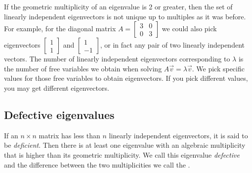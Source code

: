 \documentclass[12pt]{book}
\begin{document}
If the geometric multiplicity of an eigenvalue is 2 or greater,
then the set of linearly independent eigenvectors is not unique up to
multiples as it was before.  For example, for the diagonal matrix $A =
\left[ \begin{smallmatrix} 3 & 0 \\ 0 & 3 \end{smallmatrix} \right]$
we could also pick eigenvectors
$\left[ \begin{smallmatrix} 1 \\ 1 \end{smallmatrix} \right]$
and
$\left[ \begin{smallmatrix} 1 \\ -1 \end{smallmatrix} \right]$, or in fact
any pair of two linearly independent vectors.  The number of linearly
independent eigenvectors corresponding to $\lambda$
is the number of free variables we obtain when solving $A\vec{v} =
\lambda \vec{v}$.  We pick specific values for those free variables to
obtain eigenvectors.  If you pick different values, you may get different
eigenvectors.


\subsection{Defective eigenvalues}

If an $n \times n$ matrix has less than $n$ linearly independent
eigenvectors, it is said to be \emph{deficient}.
Then there is at least
one eigenvalue with an algebraic multiplicity that is higher than its geometric
multiplicity.  We call this eigenvalue \emph{defective}
and the difference
between the two multiplicities we call the \emph{}.
\end{document}
